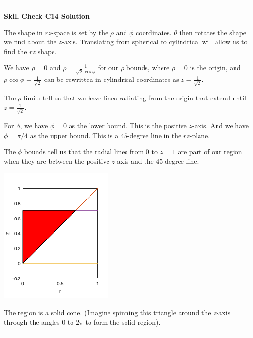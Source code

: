\documentclass[12pt,letterpaper,noanswers]{exam}
\begin{document}
\vspace{0.2cm}
\hrule
\vspace{0.2cm}

\noindent\textbf{Skill Check C14 Solution}

The shape in $rz$-space is set by the $\rho$ and $\phi$ coordinates.  $\theta$ then rotates the shape we find about the $z$-axis.  Translating from spherical to cylindrical will allow us to find the $rz$ shape.

We have $\rho = 0$ and $\rho = \frac{1}{\sqrt{2}\cos\phi}$ for our $\rho$ bounds, where $\rho = 0$ is the origin, and $\rho\cos\phi = \frac{1}{\sqrt{2}}$ can be rewritten in cylindrical coordinates as $z = \frac{1}{\sqrt{2}}$.

The $\rho$ limits tell us that we have lines radiating from the origin that extend until $z = \frac{1}{\sqrt{2}}$.

For $\phi$, we have $\phi = 0$ as the lower bound.  This is the positive $z$-axis.  And we have $\phi = \pi/4$ as the upper bound.  This is a $45$-degree line in the $rz$-plane.

The $\phi$ bounds tell us that the radial lines from $0$ to $z=1$ are part of our region when they are between the positive $z$-axis and the $45$-degree line.

\includegraphics[scale=0.5]{img/C13skill.png}

The region is a solid cone.  (Imagine spinning this triangle around the $z$-axis through the angles $0$ to $2\pi$ to form the solid region).

\vspace{0.2cm}
\hrule
\vspace{0.2cm}
\end{document}

